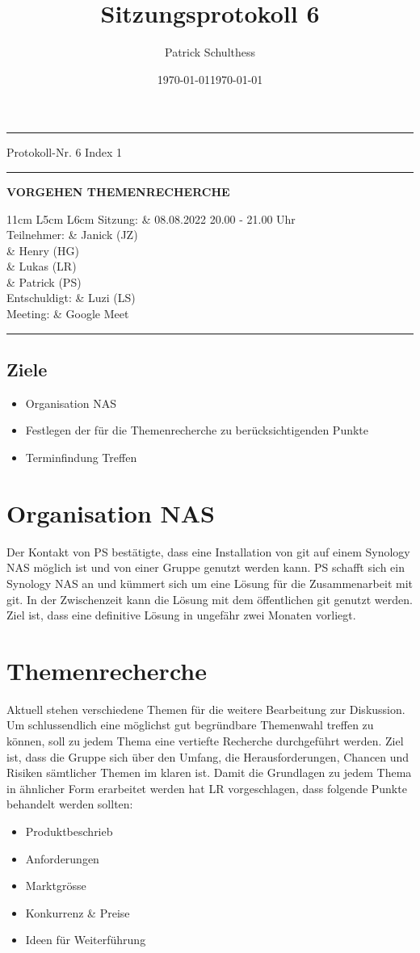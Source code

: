 \documentclass[10pt]{extarticle}
\date{}
\date{\today}
\makeatletter
\renewenvironment{abstract}
 {\par\noindent\ignorespaces}
 {\par\medskip}
\renewcommand{\maketitle}{\setlength{\parindent}{0pt}
\begin{flushleft}
  \huge\@title
  \par\vspace{1cm}
  \normalsize\@author
  \vspace{1cm}  
  
  \hrule
  \begin{minipage}[t]{\textwidth}
    \begin{minipage}[t]{0.25\textwidth}
    \vspace{0.3cm}
	Protokoll-Nr. 6 
	Index 1
    \vspace{0.3cm}
	\hrule
	\vspace{0.3cm}
	\date{\today}
	\vspace{0.3cm}
	\end{minipage}
	\begin{minipage}[t]{0.05\textwidth}
	 \hfill
	\end{minipage}
	\begin{minipage}[t]{0.70\textwidth}
	\begin{flushleft}    
	\vspace{0.3cm}
	\textbf{VORGEHEN THEMENRECHERCHE}
	\vspace{0.3cm}
	
\begin{tabularx}{11cm} { 
   L{5cm}
   L{6cm}
  }
 \toprule
 Sitzung: & 08.08.2022 20.00 - 21.00 Uhr\\
 Teilnehmer: & Janick (JZ) \\
 			& Henry (HG) \\
 			& Lukas (LR) \\
            & Patrick (PS)\\
Entschuldigt: & Luzi (LS) \\
 Meeting: & Google Meet \\
 \end{tabularx}	
\begin{abstract}
\end{abstract}
\end{flushleft}
    \vspace{0.3cm}
	\end{minipage}
  \end{minipage}
  
  \hrule
\end{flushleft}
\vspace{1cm}

}
\makeatother
\begin{document}
\title{Sitzungsprotokoll 6}
\author{Patrick Schulthess}
\maketitle


\colorbox{light-gray}{\begin{minipage}{17cm}
\vspace{0.25cm}
\section*{Ziele}
\begin{itemize}
\item Organisation NAS
\item Festlegen der für die Themenrecherche zu berücksichtigenden Punkte
\item Terminfindung Treffen
\end{itemize}
\vspace{0.25cm}
\end{minipage}}

\section{Organisation NAS}
Der Kontakt von PS bestätigte, dass eine Installation von git auf einem Synology NAS möglich ist und von einer Gruppe genutzt werden kann. PS schafft sich ein Synology NAS an und kümmert sich um eine Lösung für die Zusammenarbeit mit git. In der Zwischenzeit kann die Lösung mit dem öffentlichen git genutzt werden. Ziel ist, dass eine definitive Lösung in ungefähr zwei Monaten vorliegt.

\section{Themenrecherche}
Aktuell stehen verschiedene Themen für die weitere Bearbeitung zur Diskussion. Um schlussendlich eine möglichst gut begründbare Themenwahl treffen zu können, soll zu jedem Thema eine vertiefte Recherche durchgeführt werden. Ziel ist, dass die Gruppe sich über den Umfang, die Herausforderungen, Chancen und Risiken sämtlicher Themen im klaren ist. Damit die Grundlagen zu jedem Thema in ähnlicher Form erarbeitet werden hat LR vorgeschlagen, dass folgende Punkte behandelt werden sollten:

\begin{itemize}
\item Produktbeschrieb
\item Anforderungen
\item Marktgrösse
\item Konkurrenz \& Preise
\item Ideen für Weiterführung
\end{itemize}
\end{document}
